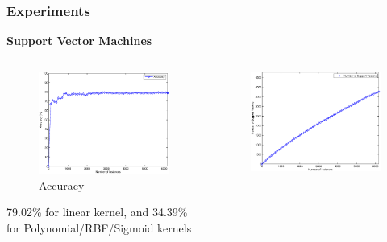 \documentclass{beamer}
\begin{document}
    \begin{frame}
        \frametitle{Experiments}
        \begin{center}
            \textbf{Support Vector Machines}
        \end{center}
        \begin{columns}
            \begin{column}{0.5\textwidth}
                \begin{figure}
                    \centering
                    \includegraphics[width=\textwidth]{figures/svm_accuracy.eps}
                    \caption{Accuracy}
                \end{figure}
                \begin{center}
                    \small 79.02\% for linear kernel, and 34.39\% for Polynomial/RBF/Sigmoid kernels
                \end{center}
            \end{column}
            \begin{column}{0.5\textwidth}
                \begin{figure}
                    \centering
                    \includegraphics[width=\textwidth]{figures/svm_n_sv.eps}

\end{figure}
\end{column}
\end{columns}
\end{frame}
\end{document}
